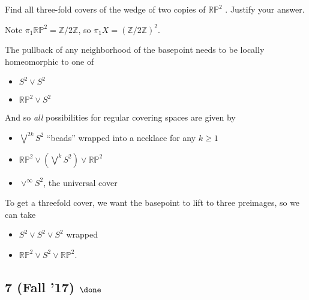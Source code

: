 Find all three-fold covers of the wedge of two copies of
\({\mathbb{RP}}^2\) . Justify your answer.

\begin{solution}

\hfill

\begin{concept}

\hfill

\end{concept}

Note \(\pi_1 {\mathbb{RP}}^2 = {\mathbb{Z}}/2{\mathbb{Z}}\), so
\(\pi_1 X = ({\mathbb{Z}}/2{\mathbb{Z}})^2\).

The pullback of any neighborhood of the basepoint needs to be locally
homeomorphic to one of

\begin{itemize}
\tightlist
\item
  \(S^2 \vee S^2\)
\item
  \({\mathbb{RP}}^2 \vee S^2\)
\end{itemize}

And so \emph{all} possibilities for regular covering spaces are given by

\begin{itemize}
\tightlist
\item
  \(\bigvee^{2k} S^2\) ``beads'' wrapped into a necklace for any
  \(k \geq 1\)
\item
  \({\mathbb{RP}}^2 \vee (\bigvee^k S^2) \vee {\mathbb{RP}}^2\)
\item
  \(\vee^\infty S^2\), the universal cover
\end{itemize}

To get a threefold cover, we want the basepoint to lift to three
preimages, so we can take

\begin{itemize}
\tightlist
\item
  \(S^2 \vee S^2 \vee S^2\) wrapped
\item
  \({\mathbb{RP}}^2 \vee S^2 \vee {\mathbb{RP}}^2\).
\end{itemize}

\end{solution}

\hypertarget{fall-17-done}{%
\subsection{\texorpdfstring{7 (Fall '17)
\(\done\)}{7 (Fall '17) \textbackslash done}}\label{fall-17-done}}

